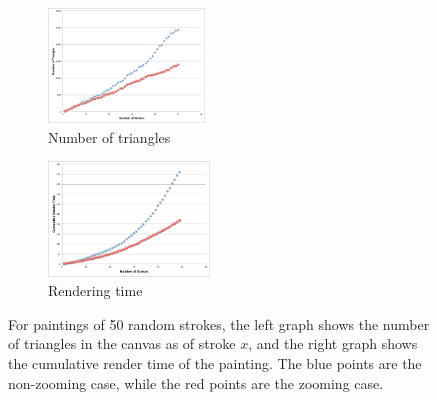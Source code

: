 \documentclass[review]{acmsiggraph}
\begin{document}
\begin{figure}
  \centering
  \begin{subfigure}[b]{0.5\columnwidth}
    \centering
    \includegraphics[height=1.2in]{graphs/numtriangles}
    \caption{Number of triangles}
    \label{fig:numtriangles}
  \end{subfigure}%
  \begin{subfigure}[b]{0.5\columnwidth}
    \centering
    \includegraphics[height=1.2in]{graphs/cumulativetime}
    \caption{Rendering time}
    \label{fig:timing}
  \end{subfigure}%
  \caption{For paintings of 50 random strokes, the left graph shows the number of triangles in the canvas as of stroke $x$, and the right graph shows the cumulative render time of the painting. The blue points are the non-zooming case, while the red points are the zooming case.}
\end{figure}



\end{document}
